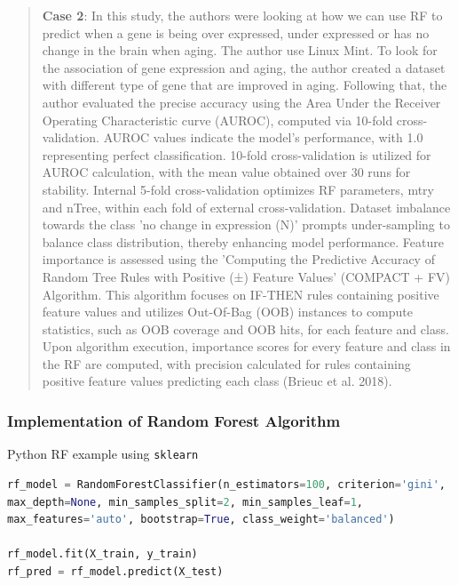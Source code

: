 \begin{quote}
\textbf{Case 2}: In this study, the authors were looking at how we can
use RF to predict when a gene is being over expressed, under expressed
or has no change in the brain when aging. The author use Linux Mint. To
look for the association of gene expression and aging, the author
created a dataset with different type of gene that are improved in
aging. Following that, the author evaluated the precise accuracy using
the Area Under the Receiver Operating Characteristic curve (AUROC),
computed via 10-fold cross-validation. AUROC values indicate the model's
performance, with 1.0 representing perfect classification. 10-fold
cross-validation is utilized for AUROC calculation, with the mean value
obtained over 30 runs for stability. Internal 5-fold cross-validation
optimizes RF parameters, mtry and nTree, within each fold of external
cross-validation. Dataset imbalance towards the class 'no change in
expression (N)' prompts under-sampling to balance class distribution,
thereby enhancing model performance. Feature importance is assessed
using the 'Computing the Predictive Accuracy of Random Tree Rules with
Positive (±) Feature Values' (COMPACT + FV) Algorithm. This algorithm
focuses on IF-THEN rules containing positive feature values and utilizes
Out-Of-Bag (OOB) instances to compute statistics, such as OOB coverage
and OOB hits, for each feature and class. Upon algorithm execution,
importance scores for every feature and class in the RF are computed,
with precision calculated for rules containing positive feature values
predicting each class (Brieuc et al. 2018).
\end{quote}

\subsubsection{Implementation of Random Forest Algorithm}

\begin{algorithm}
    \caption{Python RF example using \texttt{sklearn}}\label{alg:rf_py}
\begin{lstlisting}[language=Python]
rf_model = RandomForestClassifier(n_estimators=100, criterion='gini',
max_depth=None, min_samples_split=2, min_samples_leaf=1,
max_features='auto', bootstrap=True, class_weight='balanced')

rf_model.fit(X_train, y_train)
rf_pred = rf_model.predict(X_test)

\end{lstlisting}
\end{algorithm}

